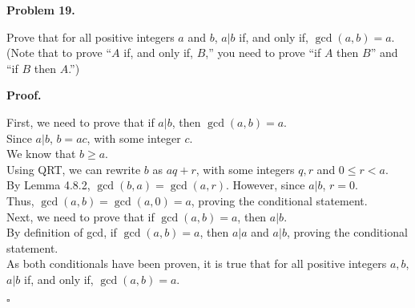 \documentclass{article}
\newenvironment{problem}[1]{
    \begin{mdframed}[backgroundcolor=gray!20, skipabove=\baselineskip, skipbelow=\baselineskip, nobreak=true, innerleftmargin=10pt, innerrightmargin=10pt, innertopmargin=10pt, innerbottommargin=10pt]
    \textbf{Problem #1.}
}{
    \end{mdframed}
}
\newenvironment{proof}{
    \begin{mdframed}[nobreak=false, innerleftmargin=10pt, innerrightmargin=10pt, innertopmargin=10pt, innerbottommargin=10pt]
    \textbf{Proof.}
}{
    \hfill $\square$
    \end{mdframed}
}
\begin{document}
    \begin{problem}{19}
        Prove that for all positive integers $a$ and $b$, $a | b$ if, and only if, $\gcd(a,b) = a$. (Note that to prove ``$A$ if, and only if, $B$,'' you need to prove ``if $A$ then $B$'' and ``if $B$ then $A$.'')
    \end{problem}
    \begin{proof}
        First, we need to prove that if $a | b$, then $\gcd(a, b) = a$. \\
        Since $a|b$, $b = ac$, with some integer $c$. \\
        We  know that $b\geq a$. \\
        Using QRT, we can rewrite $b$ as $aq + r$, with some integers $q, r$ and $0\leq r < a$. \\
        By Lemma 4.8.2, $\gcd(b, a) = \gcd(a, r)$. However, since $a | b$, $r = 0$. \\
        Thus, $\gcd(a, b) = \gcd(a, 0) = a$, proving the conditional statement. \\
        Next, we need to prove that if $\gcd(a, b) = a$, then $a | b$. \\
        By definition of gcd, if $\gcd(a, b) = a$, then $a | a$ and $a | b$, proving the conditional statement. \\
        As both conditionals have been proven, it is true that for all positive integers $a, b$, $a | b$ if, and only if, $\gcd(a, b) = a$.
    \end{proof}
\end{document}
